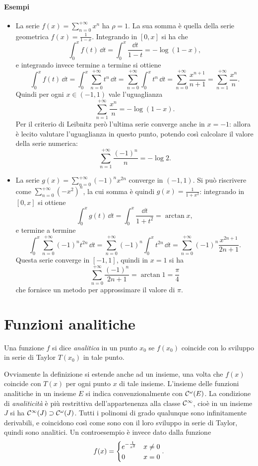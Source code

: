 \paragraph{Esempi}
\begin{itemize}
\item La serie $f(x)=\sum_{n=0}^{+\infty}x^n$ ha $\rho=1$. La sua somma è quella della serie geometrica $f(x)=\frac1{1-x}$. Integrando in $[0,x]$ si ha che
\[
\int_0^xf(t)\,\dd t=\int_0^x\frac{\dd t}{1-t}=-\log(1-x),
\]
e integrando invece termine a termine si ottiene
\[
\int_0^xf(t)\,\dd t=\int_0^x\sum_{n=0}^{+\infty}t^n\,\dd t=\sum_{n=0}^{+\infty}\int_0^xt^n\,\dd t=\sum_{n=0}^{+\infty}\frac{x^{n+1}}{n+1}=\sum_{n=1}^{+\infty}\frac{x^n}{n}.
\]
Quindi per ogni $x\in(-1,1)$ vale l'uguaglianza
\[
\sum_{n=1}^{+\infty}\frac{x^n}{n}=-\log(1-x).
\]
Per il criterio di Leibnitz però l'ultima serie converge anche in $x=-1$: allora è lecito valutare l'uguaglianza in questo punto, potendo così calcolare il valore della serie numerica:
\[
\sum_{n=1}^{+\infty}\frac{(-1)^n}{n}=-\log 2.
\]
\item La serie $g(x)=\sum_{n=0}^{+\infty}(-1)^nx^{2n}$ converge in $(-1,1)$. Si può riscrivere come $\sum_{n=0}^{+\infty}(-x^2)^n$, la cui somma è quindi $g(x)=\frac1{1+x^2}$: integrando in $[0,x]$ si ottiene
\[
\int_0^xg(t)\,\dd t=\int_0^x\frac{\dd t}{1+t^2}=\arctan x,
\]
e termine a termine
\[
\int_0^x\sum_{n=0}^{+\infty}(-1)^nt^{2n}\,\dd t=\sum_{n=0}^{+\infty}(-1)^n\int_0^xt^{2n}\,\dd t=\sum_{n=0}^{+\infty}(-1)^n\frac{x^{2n+1}}{2n+1}.
\]
Questa serie converge in $[-1,1]$, quindi in $x=1$ si ha
\[
\sum_{n=0}^{+\infty}\frac{(-1)^n}{2n+1}=\arctan 1=\frac{\pi}4
\]
che fornisce un metodo per approssimare il valore di $\pi$.
\end{itemize}

\section{Funzioni analitiche}
\begin{definizione}
Una funzione $f$ si dice \emph{analitica} in un punto $x_0$ se $f(x_0)$ coincide con lo sviluppo in serie di Taylor $T(x_0)$ in tale punto.
\end{definizione}
Ovviamente la definizione si estende anche ad un insieme, una volta che $f(x)$ coincide con $T(x)$ per ogni punto $x$ di tale insieme.
L'insieme delle funzioni analitiche in un insieme $E$ si indica convenzionalmente con $\mathcal{C}^{{\omega}}(E)$. La condizione di \emph{analiticità} è più restrittiva dell'appartenenza alla classe $\mathcal{C}^{{\infty}}$, cioè in un insieme $J$ si ha $\mathcal{C}^{{\infty}}(J)\supset\mathcal{C}^{{\omega}}(J)$.
Tutti i polinomi di grado qualunque sono infinitamente derivabili, e coincidono così come sono con il loro sviluppo in serie di Taylor, quindi sono analitici. Un controesempio è invece dato dalla funzione
\[
f(x)=\begin{dcases}e^{-\frac1{x^2}}&x\neq 0\\0&x=0\end{dcases}.
\]

